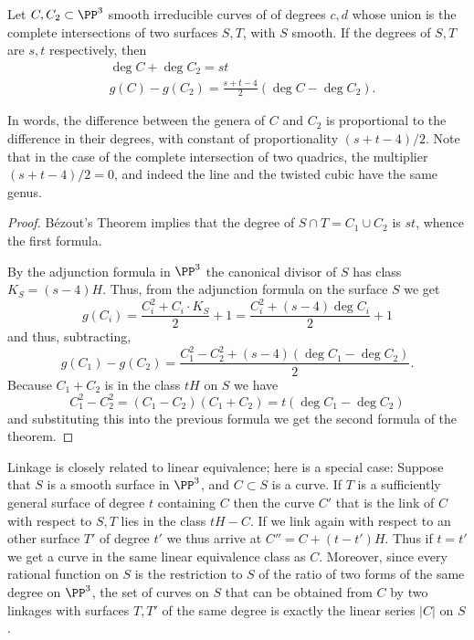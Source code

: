 \begin{theorem}\label{liaison genus formula-first version} Let $C, {C_2}\subset \PP^3$ smooth irreducible curves of  of degrees $c,d$ whose union is the complete intersections of two surfaces $S,T$, with $S$ smooth. If the degrees of $S,T$ are $s,t$ respectively, then
$$
\begin{aligned}
&\deg C+\deg C_2 = st\\
&g(C) - g({C_2}) = \frac{s+t-4}{2}(\deg C-\deg {C_2}).
\end{aligned}
 $$
\end{theorem}
In words, the difference between the genera of $C$ and ${C_2}$ is proportional to the difference in their degrees, with constant of proportionality $(s+t-4)/2$. Note that in the case of the complete intersection of two quadrics, the multiplier $(s+t-4)/2 = 0$, and indeed the line and the twisted cubic have the same genus.

\begin{proof}
B\'ezout's Theorem implies that the degree of $S\cap T = C_1\cup C_2$ is $st$, whence the first formula.

By the adjunction formula in $\PP^3$ the canonical divisor of $S$ has class $K_S = (s-4)H$. Thus, from the 
adjunction formula on the surface $S$ we get
$$
g(C_i) = \frac{C_i^2+C_i\cdot K_S}{2}+1 = \frac{C_i^2+(s-4) \deg C_i}{2}+1
$$
and thus, subtracting,
$$
g(C_1)-g(C_2) = \frac{C_1^2-C_2^2+(s-4) (\deg C_1-\deg C_2)} {2}.
$$
Because $C_1+C_2$ is in the class $tH$ on $S$ we have
$$
C_1^2-C_2^2 = (C_1-C_2)(C_1+C_2) = t(\deg C_1-\deg C_2)
$$
and substituting this into the previous formula we get the second formula of the theorem.
\end{proof}

\begin{remark}
Linkage is closely related to linear equivalence; here is a special case:
Suppose that $S$ is a smooth surface in $\PP^3$, and $C\subset S$ is a curve. If $T$ is a sufficiently general surface of degree $t$
containing $C$ then the curve $C'$ that is the link of $C$ with respect to $S,T$ lies in the class $tH-C$. If we link again with
respect to an other surface $T'$ of degree $t'$ we thus arrive at $C'' = C+(t-t')H$. Thus if $t=t'$ we get a curve in the same 
linear equivalence class as $C$. Moreover, since every rational function on $S$ is the restriction to $S$ of the ratio of two forms of the same degree on $\PP^3$,
the set of curves on $S$ that can be obtained from $C$ by two linkages with surfaces $T, T'$ of the same degree is exactly the 
linear series $|C|$ on $S$.
\end{remark}


